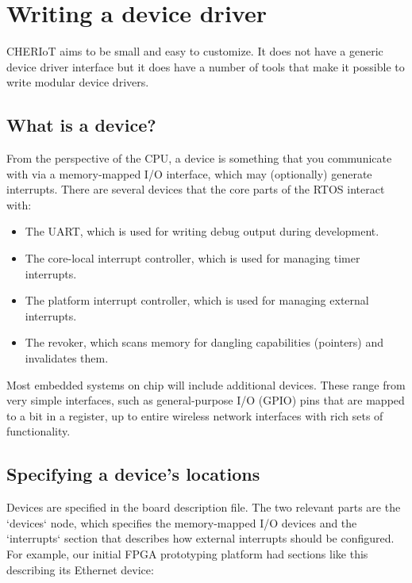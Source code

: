 \chapter[label=drivers]{Writing a device driver}

CHERIoT aims to be small and easy to customize.
It does not have a generic device driver interface but it does have a number of tools that make it possible to write modular device drivers.

\section{What is a device?}

From the perspective of the CPU, a device is something that you communicate with via a memory-mapped I/O interface, which may (optionally) generate interrupts.
There are several devices that the core parts of the RTOS interact with:

\begin{itemize}
	\item{The UART, which is used for writing debug output during development.}
	\item{The core-local interrupt controller, which is used for managing timer interrupts.}
	\item{The platform interrupt controller, which is used for managing external interrupts.}
	\item{The revoker, which scans memory for dangling capabilities (pointers) and invalidates them.}
\end{itemize}

Most embedded systems on chip will include additional devices.
These range from very simple interfaces, such as general-purpose I/O (GPIO) pins that are mapped to a bit in a register, up to entire wireless network interfaces with rich sets of functionality.

\section{Specifying a device's locations}

Devices are specified in the board description file.
The two relevant parts are the `devices` node, which specifies the memory-mapped I/O devices and the `interrupts` section that describes how external interrupts should be configured.
For example, our initial FPGA prototyping platform had sections like this describing its Ethernet device:

